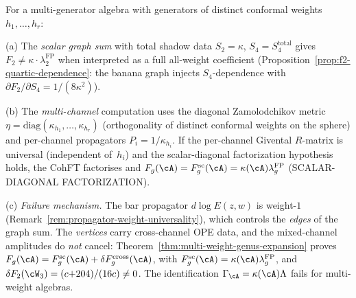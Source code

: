 \begin{remark}%
\label{rem:multigen-structural-diagnosis}%
%
%
For a multi-generator algebra with generators of distinct
conformal weights $h_1, \ldots, h_r$:

\textup{(a)} The \emph{scalar graph sum} with total shadow data
$S_2 = \kappa$, $S_4 = S_4^{\mathrm{total}}$ gives
$F_2 \neq \kappa \cdot \lambda_2^{\mathrm{FP}}$
when interpreted as a full all-weight coefficient
(Proposition~\ref{prop:f2-quartic-dependence}: the banana graph
injects $S_4$-dependence with $\partial F_2/\partial S_4 =
1/(8\kappa^2)$).

\textup{(b)} The \emph{multi-channel} computation uses the
diagonal Zamolodchikov metric
$\eta = \mathrm{diag}(\kappa_{h_1}, \ldots, \kappa_{h_r})$
(orthogonality of distinct conformal weights on the sphere)
and per-channel propagators $P_i = 1/\kappa_{h_i}$.
If the per-channel Givental $R$-matrix is universal
(independent of~$h_i$) and the scalar-diagonal factorization
hypothesis holds, the CohFT factorises and
\(F_g(\cA)=F_g^{\mathrm{sc}}(\cA)
=\kappa(\cA)\lambda_g^{\mathrm{FP}}\)
\textup{(}SCALAR-DIAGONAL FACTORIZATION\textup{)}.

\textup{(c)} \emph{Failure mechanism.}
The bar propagator $d\log E(z,w)$ is weight-$1$
(Remark~\ref{rem:propagator-weight-universality}),
which controls the \emph{edges} of the graph sum.
The \emph{vertices} carry cross-channel OPE data, and the
mixed-channel amplitudes do \emph{not} cancel:
Theorem~\ref{thm:multi-weight-genus-expansion} proves
$F_g(\cA) = F_g^{\mathrm{sc}}(\cA)
+ \delta F_g^{\mathrm{cross}}(\cA)$, with
$F_g^{\mathrm{sc}}(\cA)=\kappa(\cA)\lambda_g^{\mathrm{FP}}$,
and $\delta F_2(\cW_3) = (c{+}204)/(16c) \neq 0$.
The identification
$\Gamma_{\cA} = \kappa(\cA)\Lambda$ fails for multi-weight
algebras.
\end{remark}

